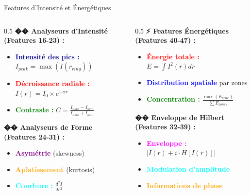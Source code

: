 \documentclass[aspectratio=169]{beamer}
\begin{document}
\begin{frame}{Features d'Intensité et Énergétiques}
    \begin{columns}
        \begin{column}{0.5\textwidth}
            \textbf{�� Analyseurs d'Intensité (Features 16-23) :}
            \begin{itemize}
                \item \textcolor{darkblue}{\textbf{Intensité des pics :}} $I_{peak} = \max(I(r_{ring}))$
                \item \textcolor{red}{\textbf{Décroissance radiale :}} $I(r) = I_0 \times e^{-\alpha r}$
                \item \textcolor{green}{\textbf{Contraste :}} $C = \frac{I_{max} - I_{min}}{I_{max} + I_{min}}$
            \end{itemize}

            \vspace{0.3cm}
            \textbf{�� Analyseurs de Forme (Features 24-31) :}
            \begin{itemize}
                \item \textcolor{purple}{\textbf{Asymétrie}} (skewness)
                \item \textcolor{orange}{\textbf{Aplatissement}} (kurtosis)
                \item \textcolor{cyan}{\textbf{Courbure :}} $\frac{d^2I}{dr^2}$
            \end{itemize}
        \end{column}
        \begin{column}{0.5\textwidth}
            \textbf{⚡ Features Énergétiques (Features 40-47) :}
            \begin{itemize}
                \item \textcolor{red}{\textbf{Énergie totale :}} $E = \int I^2(r) dr$
                \item \textcolor{blue}{\textbf{Distribution spatiale}} par zones
                \item \textcolor{green}{\textbf{Concentration :}} $\frac{\max(E_{zone})}{\sum E_{zones}}$
            \end{itemize}

            \vspace{0.3cm}
            \textbf{�� Enveloppe de Hilbert (Features 32-39) :}
            \begin{itemize}
                \item \textcolor{magenta}{\textbf{Enveloppe :}} $|I(r) + i \cdot H[I(r)]|$
                \item \textcolor{cyan}{\textbf{Modulation d'amplitude}}
                \item \textcolor{orange}{\textbf{Informations de phase}}
            \end{itemize}
        \end{column}
    \end{columns}
\end{frame}
\end{document}

